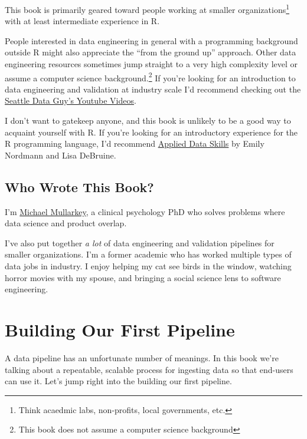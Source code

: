 \documentclass[
  letterpaper,
  DIV=11,
  numbers=noendperiod]{scrreprt}
\begin{document}
This book is primarily geared toward people working at smaller
organizations\footnote{Think acaedmic labs, non-profits, local
  governments, etc.} with at least intermediate experience in R.

People interested in data engineering in general with a programming
background outside R might also appreciate the ``from the ground up''
approach. Other data engineering resources sometimes jump straight to a
very high complexity level or assume a computer science
background.\footnote{This book does not assume a computer science
  background} If you're looking for an introduction to data engineering
and validation at industry scale I'd recommend checking out the
\href{https://www.youtube.com/@SeattleDataGuy/videos}{Seattle Data Guy's
Youtube Videos}.

I don't want to gatekeep anyone, and this book is unlikely to be a good
way to acquaint yourself with R. If you're looking for an introductory
experience for the R programming language, I'd recommend
\href{https://psyteachr.github.io/ads-v2/}{Applied Data Skills} by Emily
Nordmann and Lisa DeBruine.

\hypertarget{who-wrote-this-book}{%
\section*{Who Wrote This Book?}\label{who-wrote-this-book}}

I'm \href{https://mcmullarkey.github.io/}{Michael Mullarkey}, a clinical
psychology PhD who solves problems where data science and product
overlap.

I've also put together \emph{a lot} of data engineering and validation
pipelines for smaller organizations. I'm a former academic who has
worked multiple types of data jobs in industry. I enjoy helping my cat
see birds in the window, watching horror movies with my spouse, and
bringing a social science lens to software engineering.


\hypertarget{building-our-first-pipeline}{%
\chapter{Building Our First
Pipeline}\label{building-our-first-pipeline}}

A data pipeline has an unfortunate number of meanings. In this book
we're talking about a repeatable, scalable process for ingesting data so
that end-users can use it. Let's jump right into the building our first
pipeline.
\end{document}
